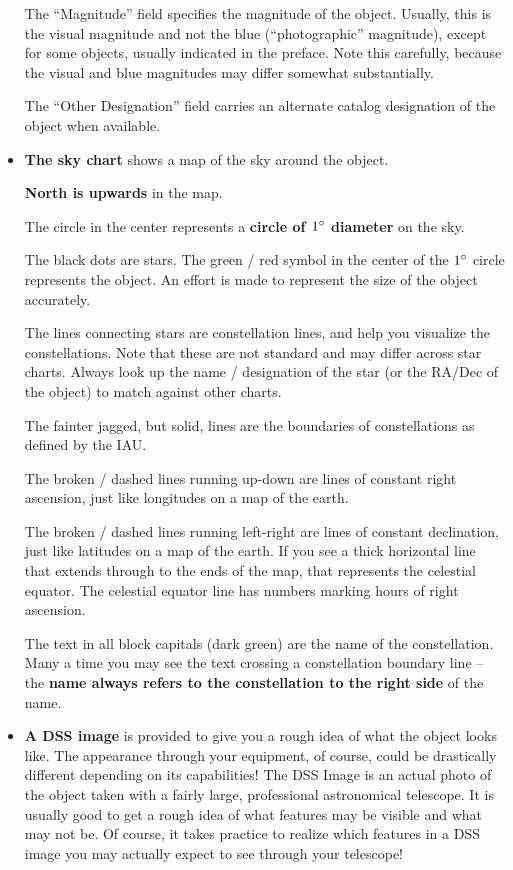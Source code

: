 \begin{itemize}
  The ``Magnitude'' field specifies the magnitude of the
  object. Usually, this is the visual magnitude and not the blue
  (``photographic'' magnitude), except for some objects, usually
  indicated in the preface. Note this carefully, because the visual
  and blue magnitudes may differ somewhat substantially.

  The ``Other Designation'' field carries an alternate catalog
  designation of the object when available.

\item \textbf{The sky chart} shows a map of the sky around the
  object.

  \textbf{North is upwards} in the map.
  
  The circle in the center represents a \textbf{circle of $1^\circ$
    diameter} on the sky.

  The black dots are stars. The green / red symbol in the center of
  the $1^\circ$ circle represents the object. An effort is made to
  represent the size of the object accurately.

  The lines connecting stars are constellation lines, and help you
  visualize the constellations. Note that these are not standard and
  may differ across star charts. Always look up the name / designation
  of the star (or the RA/Dec of the object) to match against other
  charts.

  The fainter jagged, but solid, lines are the boundaries of
  constellations as defined by the IAU.

  The broken / dashed lines running up-down are lines of constant
  right ascension, just like longitudes on a map of the earth.

  The broken / dashed lines running left-right are lines of constant
  declination, just like latitudes on a map of the earth. If you see a
  thick horizontal line that extends through to the ends of the map,
  that represents the celestial equator. The celestial equator line
  has numbers marking hours of right ascension.

  The text in all block capitals (dark green) are the name of the
  constellation. Many a time you may see the text crossing a
  constellation boundary line -- the \textbf{name always refers to the
    constellation to the right side} of the name.

\item \textbf{A DSS image} is provided to give you a rough idea of
  what the object looks like. The appearance through your equipment,
  of course, could be drastically different depending on its
  capabilities! The DSS Image is an actual photo of the object taken
  with a fairly large, professional astronomical telescope. It is
  usually good to get a rough idea of what features may be visible and
  what may not be. Of course, it takes practice to realize which
  features in a DSS image you may actually expect to see through your
  telescope!


\end{itemize}
